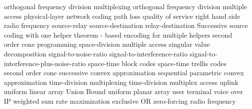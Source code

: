   {orthogonal frequency division multiplexing}
   {orthogonal frequency division multiple access}
 {physical-layer network coding}
   {path loss}
   {quality of service}
 {right hand side}
 {radio frequency}
 {source-relay}
 {source-destination}
 {relay-destination}
 {Successive source coding with one helper theorem - based encoding for multiple helpers}
   {second order cone programming}
   {space-division multiple access}
   {singular value decomposition}
   {signal-to-noise-ratio}
   {signal-to-interference-ratio}
   {signal-to-interference-plus-noise-ratio}
   {space-time block codes}
   {space-time trellis codes}
   {second order cone}
   {successive convex approximation}
   {sequential parametric convex approximation}
   {time-division multiplexing}
   {time-division multiplex access}
   {uplink}
 {uniform linear array}
 {Union Bound}
 {uniform planar array}
 {user terminal}
   {voice over IP}
   {weighted sum rate maximization}
 {exclusive OR}
   {zero-forcing}
 {radio frequency}

